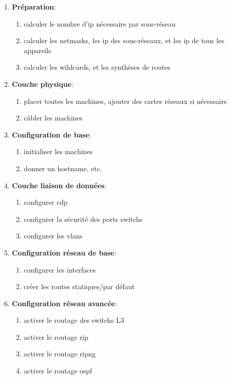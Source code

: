 \documentclass[a4paper]{article}
\begin{document}
\begin{enumerate}
    \item \textbf{Préparation}:
    \begin{enumerate}
        \item calculer le nombre d'ip nécessaire par sous-réseau
        \item calculer les netmasks, les ip des sous-réseaux, et les ip de tous les appareils
        \item calculer les wildcards, et les synthèses de routes
    \end{enumerate}
    \item \textbf{Couche physique}:
    \begin{enumerate}
        \item placer toutes les machines, ajouter des cartes réseaux si nécessaire
        \item câbler les machines
    \end{enumerate}
    \item \textbf{Configuration de base}:
    \begin{enumerate}
        \item initialiser les machines
        \item donner un hostname, etc.
    \end{enumerate}
    \item \textbf{Couche liaison de données}:
    \begin{enumerate}
        \item configurer cdp
        \item configurer la sécurité des ports switchs
        \item configurer les vlans
    \end{enumerate}
    \item \textbf{Configuration réseau de base}:
    \begin{enumerate}
        \item configurer les interfaces
        \item créer les routes statiques/par défaut
    \end{enumerate}
    \item \textbf{Configuration réseau avancée}:
    \begin{enumerate}
        \item activer le routage des switchs L3
        \item activer le routage rip
        \item activer le routage ripng
        \item activer le routage ospf

\end{enumerate}
\end{enumerate}
\end{document}
